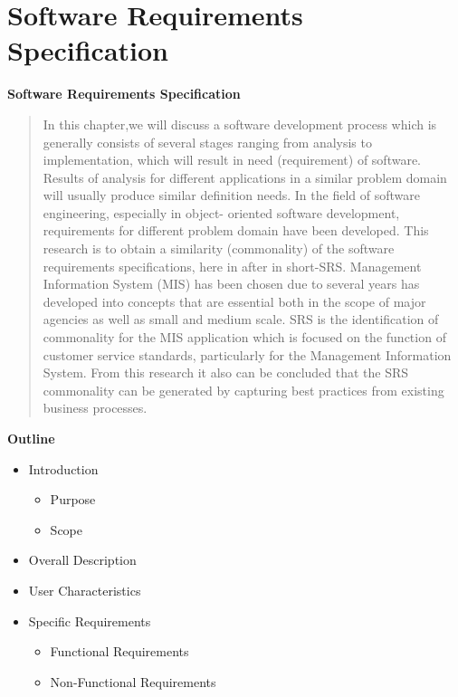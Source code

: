 
\section{Software Requirements Specification}

\vspace{20mm}

\Huge{\textbf{Software Requirements Specification}}

\vspace{20mm}




\begin{abstract}
	In this chapter,we will discuss a software development process which is generally consists of several stages ranging from analysis
    to implementation, which will result in need (requirement) of software. Results of analysis for different
    applications in a similar problem domain will usually produce similar definition needs. In the field of 
    software engineering, especially in object- oriented software development, requirements for different problem
    domain have been developed. This research is to obtain a similarity (commonality) of the software requirements
    specifications, here in after in short-SRS. Management Information System (MIS) has been chosen due to several
    years has developed into concepts that are essential both in the scope of major agencies as well as small and medium
    scale. SRS is the identification of commonality for the MIS application which is focused on the function of customer
    service standards, particularly for the Management Information System. From this research it also can be concluded
    that the SRS commonality can be generated by capturing best practices from existing business processes.
    
\end{abstract}

\vspace{20mm}

\large{\textbf{Outline}}

\begin{center}
    \begin{itemize}
        \item Introduction
              \begin{itemize}
                  \item Purpose
                  \item Scope
              \end{itemize}
        \item Overall Description
        \item User Characteristics
        \item Specific Requirements
              \begin{itemize}
                  \item Functional Requirements
                  \item Non-Functional Requirements
              \end{itemize}
    \end{itemize}
\end{center}
\pagebreak


